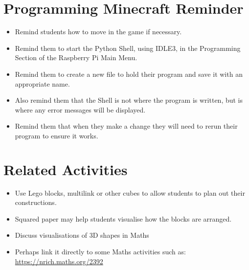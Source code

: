 \documentclass{geocraft-lesson-plan}
\begin{document}
\section*{Programming Minecraft Reminder}
\begin{itemize}
\item Remind students how to move in the game if necessary.
\item Remind them to start the Python Shell, using IDLE3, in the Programming Section of the Raspberry Pi Main Menu.
\item Remind them to create a new file to hold their program and save it with an appropriate name.
\item Also remind them that the Shell is not where the program is written, but is where any error messages will be
  displayed. 
\item Remind them that when they make a change they will need to rerun their program to ensure it works.
\end{itemize}

\section*{Related Activities}
\begin{itemize}
\item Use Lego blocks, multilink or other cubes to allow students to plan out their constructions.
\item Squared paper may help students visualise how the blocks are arranged.
\item Discuss visualisations of 3D shapes in Maths
\item Perhaps link it directly to some Maths activities such as: 
  {\textcolor{greenish}
    {\url{https://nrich.maths.org/2392}}}
\end{itemize}
\end{document}
